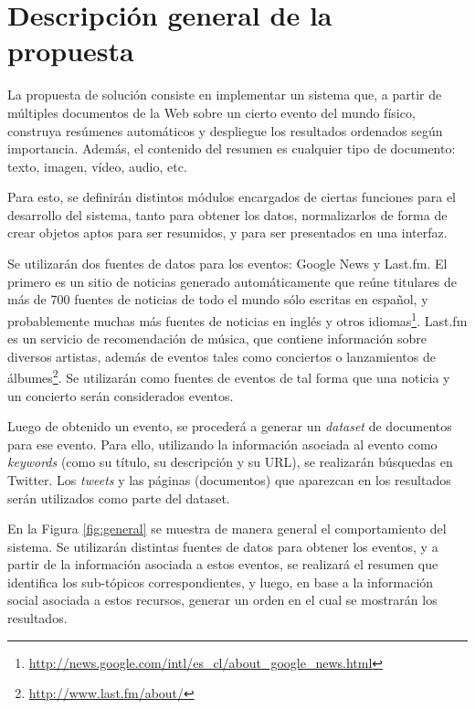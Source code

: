 \documentclass[11pt,letterpaper]{article}
\begin{document}
\pagebreak
\section{Descripción general de la propuesta}
\label{sec-3}

  La propuesta de solución consiste en implementar un sistema que, a
  partir de múltiples documentos de la Web sobre un cierto evento del
  mundo físico, construya resúmenes automáticos y despliegue los
  resultados ordenados según importancia. Además, el contenido del
  resumen es cualquier tipo de documento: texto, imagen, vídeo, audio,
  etc.

  Para esto, se definirán distintos módulos encargados de ciertas
  funciones para el desarrollo del sistema, tanto para obtener los
  datos, normalizarlos de forma de crear objetos aptos para ser
  resumidos, y para ser presentados en una interfaz.

  Se utilizarán dos fuentes de datos para los eventos: Google News y
  Last.fm. El primero es un sitio de noticias generado automáticamente
  que reúne titulares de más de 700 fuentes de noticias de todo el mundo
  sólo escritas en español, y probablemente muchas más fuentes de
  noticias en inglés y otros idiomas\footnote{\href{http://news.google.com/intl/es_cl/about_google_news.html}{http://news.google.com/intl/es\_cl/about\_google\_news.html} }. 
  Last.fm es un servicio de recomendación de música, que contiene
  información sobre diversos artistas, además de eventos tales como
  conciertos o lanzamientos de
  álbumes\footnote{\href{http://www.last.fm/about/}{http://www.last.fm/about/} }. Se utilizarán como fuentes 
  de eventos de tal forma que una noticia y un concierto serán 
  considerados eventos. 

  Luego de obtenido un evento, se procederá a generar un \emph{dataset} de
  documentos para ese evento. Para ello, utilizando la información
  asociada al evento como \emph{keywords} (como su título, su descripción y
  su URL), se realizarán búsquedas en Twitter. Los \emph{tweets} y las
  páginas (documentos) que aparezcan en los resultados serán utilizados
  como parte del dataset.

  En la Figura \ref{fig:general} se muestra de manera general el
  comportamiento del sistema. Se utilizarán distintas fuentes de datos
  para obtener los eventos, y a partir de la información asociada a
  estos eventos, se realizará el resumen que identifica los
  sub-tópicos correspondientes, y luego, en base a la información
  social asociada a estos recursos, generar un orden en el cual se
  mostrarán los resultados.
\end{document}
